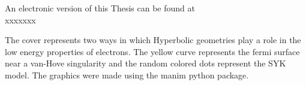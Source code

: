 \begin{titlepage}
\vspace{2\bigskipamount}


\vspace{5pt}
\noindent
An electronic version of this Thesis can be found at \\ 
xxxxxxx


\vspace*{\fill}
\noindent
The cover represents two ways in which Hyperbolic geometries play a role in the low energy properties of electrons. The yellow curve represents the fermi surface near a van-Hove singularity and the random colored dots represent the SYK model. The graphics were made using the manim python package.

\clearpage
\thispagestyle{empty}


\end{titlepage}
